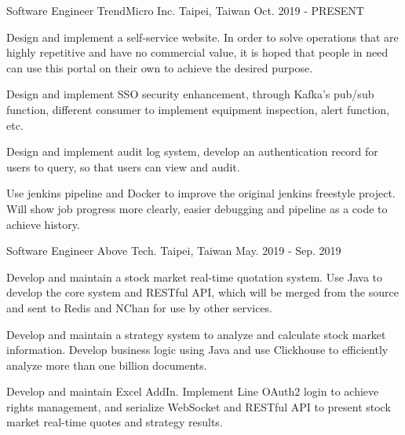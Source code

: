 

\begin{cventries}

\cventry
{Software Engineer} %
{TrendMicro Inc.} %
{Taipei, Taiwan} %
{Oct. 2019 - PRESENT} %
{
  \begin{cvitems} %
    \item {Design and implement a self-service website. In order to solve operations that are highly repetitive and have no commercial value, it is hoped that people in need can use this portal on their own to achieve the desired purpose.}
    \item {Design and implement SSO security enhancement, through Kafka's pub/sub function, different consumer to implement equipment inspection, alert function, etc.}
    \item {Design and implement audit log system, develop an authentication record for users to query, so that users can view and audit.}
    \item {Use jenkins pipeline and Docker to improve the original jenkins freestyle project. Will show job progress more clearly, easier debugging and pipeline as a code to achieve history.}
  \end{cvitems}
}

\cventry
{Software Engineer} %
{Above Tech.} %
{Taipei, Taiwan} %
{May. 2019 - Sep. 2019} %
{
  \begin{cvitems} %
    \item {Develop and maintain a stock market real-time quotation system. Use Java to develop the core system and RESTful API, which will be merged from the source and sent to Redis and NChan for use by other services.}
    \item {Develop and maintain a strategy system to analyze and calculate stock market information. Develop business logic using Java and use Clickhouse to efficiently analyze more than one billion documents.}
    \item {Develop and maintain Excel AddIn. Implement Line OAuth2 login to achieve rights management, and serialize WebSocket and RESTful API to present stock market real-time quotes and strategy results.}
  \end{cvitems}
}


\end{cventries}
